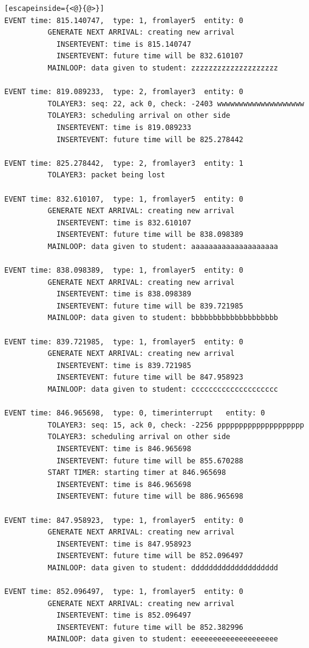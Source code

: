 \documentclass[paper=a4, fontsize=11pt]{scrartcl}
\numberwithin{equation}{section}		%
\numberwithin{figure}{section}			%
\numberwithin{table}{section}				%
\begin{document}
\begin{lstlisting}[escapeinside={<@}{@>}]
EVENT time: 815.140747,  type: 1, fromlayer5  entity: 0
          GENERATE NEXT ARRIVAL: creating new arrival
            INSERTEVENT: time is 815.140747
            INSERTEVENT: future time will be 832.610107
          MAINLOOP: data given to student: zzzzzzzzzzzzzzzzzzzz

EVENT time: 819.089233,  type: 2, fromlayer3  entity: 0
          TOLAYER3: seq: 22, ack 0, check: -2403 wwwwwwwwwwwwwwwwwwww
          TOLAYER3: scheduling arrival on other side
            INSERTEVENT: time is 819.089233
            INSERTEVENT: future time will be 825.278442

EVENT time: 825.278442,  type: 2, fromlayer3  entity: 1
          TOLAYER3: packet being lost

EVENT time: 832.610107,  type: 1, fromlayer5  entity: 0
          GENERATE NEXT ARRIVAL: creating new arrival
            INSERTEVENT: time is 832.610107
            INSERTEVENT: future time will be 838.098389
          MAINLOOP: data given to student: aaaaaaaaaaaaaaaaaaaa

EVENT time: 838.098389,  type: 1, fromlayer5  entity: 0
          GENERATE NEXT ARRIVAL: creating new arrival
            INSERTEVENT: time is 838.098389
            INSERTEVENT: future time will be 839.721985
          MAINLOOP: data given to student: bbbbbbbbbbbbbbbbbbbb

EVENT time: 839.721985,  type: 1, fromlayer5  entity: 0
          GENERATE NEXT ARRIVAL: creating new arrival
            INSERTEVENT: time is 839.721985
            INSERTEVENT: future time will be 847.958923
          MAINLOOP: data given to student: cccccccccccccccccccc

EVENT time: 846.965698,  type: 0, timerinterrupt   entity: 0
          TOLAYER3: seq: 15, ack 0, check: -2256 pppppppppppppppppppp
          TOLAYER3: scheduling arrival on other side
            INSERTEVENT: time is 846.965698
            INSERTEVENT: future time will be 855.670288
          START TIMER: starting timer at 846.965698
            INSERTEVENT: time is 846.965698
            INSERTEVENT: future time will be 886.965698

EVENT time: 847.958923,  type: 1, fromlayer5  entity: 0
          GENERATE NEXT ARRIVAL: creating new arrival
            INSERTEVENT: time is 847.958923
            INSERTEVENT: future time will be 852.096497
          MAINLOOP: data given to student: dddddddddddddddddddd

EVENT time: 852.096497,  type: 1, fromlayer5  entity: 0
          GENERATE NEXT ARRIVAL: creating new arrival
            INSERTEVENT: time is 852.096497
            INSERTEVENT: future time will be 852.382996
          MAINLOOP: data given to student: eeeeeeeeeeeeeeeeeeee


\end{lstlisting}
\end{document}
